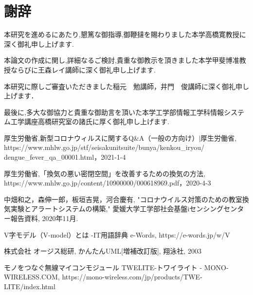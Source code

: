 	\chapter*{謝辞}
	本研究を進めるにあたり,懇篤な御指導,御鞭撻を賜わりました本学高橋寛教授に深く御礼申し上げます.
	
	本論文の作成に関し,詳細なるご検討,貴重な御教示を頂きました本学甲斐博准教授ならびに王森レイ講師に深く御礼申し上げます.
	
	本研究に際しご審査いただきました稲元　勉講師，井門　俊講師に深く御礼申し上げます．
	
	最後に,多大な御協力と貴重な御助言を頂いた本学工学部情報工学科情報システム工学講座高橋研究室の諸氏に厚く御礼申し上げます.
	
	
	\begin{thebibliography}{99}
		
		厚生労働省,新型コロナウィルスに関するQ\&A（一般の方向け）$|$厚生労働省,
		https://www.mhlw.go.jp/stf/seisakunitsuite/bunya/kenkou\_iryou/\\dengue\_fever\_qa\_00001.html，2021-1-4
		
		厚生労働省,「換気の悪い密閉空間」を改善するための換気の方法,
		https://www.mhlw.go.jp/content/10900000/000618969.pdf，2020-4-3
		
		中畑和之，森伸一郎，板垣吉晃，河合慶有, "コロナウイルス対策のための教室換気実験とアラートシステムの構築," 愛媛大学工学部社会基盤iセンシングセンター報告資料,  2020年11月.
		
		V字モデル（V-model）とは -IT用語辞典 e-Words,
		https://e-words.jp/w/V%
		
		株式会社 オージス総研, かんたんUML[増補改訂版], 翔泳社, 2003
		
		モノをつなぐ無線マイコンモジュール TWELITE-トワイライト - MONO-WIRELESS.COM,
		https://mono-wireless.com/jp/products/TWE-LITE/index.html
		
	\end{thebibliography}

